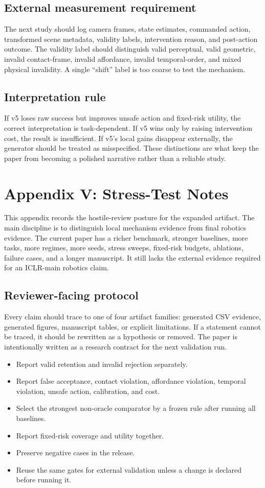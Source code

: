 \documentclass{article}
\begin{document}
\subsection{External measurement requirement}
The next study should log camera frames, state estimates, commanded action, transformed scene metadata, validity labels, intervention reason, and post-action outcome. The validity label should distinguish valid perceptual, valid geometric, invalid contact-frame, invalid affordance, invalid temporal-order, and mixed physical invalidity. A single ``shift'' label is too coarse to test the mechanism.

\subsection{Interpretation rule}
If v5 loses raw success but improves unsafe action and fixed-risk utility, the correct interpretation is task-dependent. If v5 wins only by raising intervention cost, the result is insufficient. If v5's local gains disappear externally, the generator should be treated as misspecified. These distinctions are what keep the paper from becoming a polished narrative rather than a reliable study.


\section{Appendix V: Stress-Test Notes}
This appendix records the hostile-review posture for the expanded artifact. The main discipline is to distinguish local mechanism evidence from final robotics evidence. The current paper has a richer benchmark, stronger baselines, more tasks, more regimes, more seeds, stress sweeps, fixed-risk budgets, ablations, failure cases, and a longer manuscript. It still lacks the external evidence required for an ICLR-main robotics claim.

\subsection{Reviewer-facing protocol}
Every claim should trace to one of four artifact families: generated CSV evidence, generated figures, manuscript tables, or explicit limitations. If a statement cannot be traced, it should be rewritten as a hypothesis or removed. The paper is intentionally written as a research contract for the next validation run.

\begin{itemize}
\item Report valid retention and invalid rejection separately.
\item Report false acceptance, contact violation, affordance violation, temporal violation, unsafe action, calibration, and cost.
\item Select the strongest non-oracle comparator by a frozen rule after running all baselines.
\item Report fixed-risk coverage and utility together.
\item Preserve negative cases in the release.
\item Reuse the same gates for external validation unless a change is declared before running it.
\end{itemize}
\end{document}
